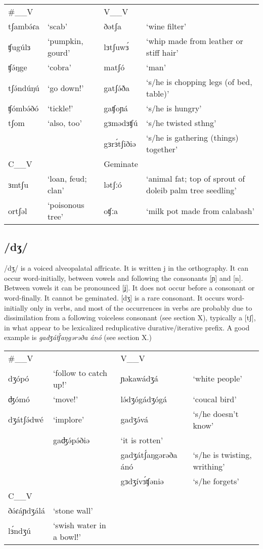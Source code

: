 \ea 	
\begin{tabular}[t]{lllp{4cm}}
\#\_\_V	&&	V\_\_V	\\
tʃambə́ɾa	&‘scab’				&ðətʃa		&‘wine filter’\\
ʧugúlɜ	&‘pumpkin, gourd’	&lɜtʃuwɜ́	&‘whip made from leather or stiff hair’\\
ʧə́ŋge	&‘cobra’ 			&matʃó		&‘man’\\
tʃə́ndúŋú	&‘go down!’			&gatʃə́ð́a		&‘s/he is chopping legs (of bed, table)’\\

ʧómbə́ðó	&‘tickle!’			&gaʧoɲá		&‘s/he is hungry’\\
tʃom	&‘also, too’		&gɜmədɜʧú	&‘s/he twisted sthng’\\
							&&gɜrɜ́tʃiðiə &‘s/he is gathering (things) together’\\
\midrule
C\_\_V	&&		Geminate	\\
\midrule
ɜmtʃu	&‘loan, feud; clan’	&lətʃːó	&‘animal fat; top of sprout of doleib palm tree seedling’\\
ortʃəl	&‘poisonous tree’	&oʧːa	&‘milk pot made from calabash’
\end{tabular}\label{ex:ch2:21}
\z 

\subsection{/dʒ/}
/dʒ/ is a voiced alveopalatal affricate. It is written j in the orthography. It can occur word-initially, between vowels and following the consonants [ɲ] and [n]. Between vowels it can be pronounced [ʝ]. It does not occur before a consonant or word-finally. It cannot be geminated. [dʒ] is a rare consonant. It occurs word-initially only in verbs, and most of the occurrences in verbs are probably due to dissimilation from a following voiceless consonant (see section X), typically a [tʃ], in what appear to be lexicalized reduplicative durative/iterative prefix. A good example is \textit{gadʒátʃ́aŋgərəða ánó} (see section X.)

\ea
\begin{tabular}[t]{llp{2.5cm}p{3cm}}
\#\_\_V	&&	V\_\_V	\\
dʒópó		&‘follow to catch up!’	&ɲəkawádʒá	&‘white people’\\
ʤómó		&‘move!’				&lə́dʒógádʒógá	&‘coucal bird’\\
dʒátʃə́dwé	&‘implore’				&gadʒə́vá	&‘s/he doesn’t know’\\
									&gaʤə́pə́ðiə	&‘it is rotten’\\

							&&gadʒátʃ́aŋgərəða ánó	&‘s/he is twisting, writhing’\\
								&&gɜdʒívɜ́ʧəniə	&‘s/he forgets’\\
\midrule				
C\_\_V	\\				 	
\midrule
ðə́ɾáɲdʒálá	&‘stone wall’			\\
lɜ́ndʒú		&‘swish water in a bowl!’	
\end{tabular}\label{ex:ch2:22}		
\z 


